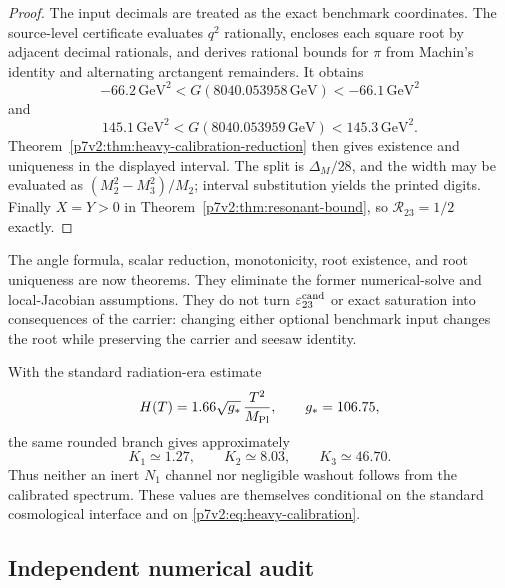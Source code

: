 \documentclass[11pt,a4paper]{article}
\begin{document}
\begin{proof}
The input decimals are treated as the exact benchmark coordinates.  The
source-level certificate evaluates \(q^2\) rationally, encloses each square
root by adjacent decimal rationals, and derives rational bounds for \(\pi\)
from Machin's identity and alternating arctangent remainders.  It obtains
\[
 -66.2\,\mathrm{GeV}^2<G(8040.053958\,\mathrm{GeV})
 <-66.1\,\mathrm{GeV}^2
\]
and
\[
 145.1\,\mathrm{GeV}^2<G(8040.053959\,\mathrm{GeV})
 <145.3\,\mathrm{GeV}^2.
\]
Theorem~\ref{p7v2:thm:heavy-calibration-reduction} then gives existence and
uniqueness in the displayed interval.  The split is \(\Delta_M/28\), and the
width may be evaluated as
\((M_2^2-M_3^2)/M_2\); interval substitution yields the printed digits.
Finally \(X=Y>0\) in Theorem~\ref{p7v2:thm:resonant-bound}, so
\(\mathcal R_{23}=1/2\) exactly.
\end{proof}

\begin{remark}
The angle formula, scalar reduction, monotonicity, root existence, and root
uniqueness are now theorems.  They eliminate the former numerical-solve and
local-Jacobian assumptions.  They do not turn
\(\varepsilon_{23}^{\rm cand}\) or exact saturation into consequences of the
carrier: changing either optional benchmark input changes the root while
preserving the carrier and seesaw identity.
\end{remark}

\begin{remark}
With the standard radiation-era estimate
\[
 H(T)=1.66\sqrt{g_*}\,\frac{T^2}{M_{\rm Pl}},
 \qquad g_*=106.75,
\]
the same rounded branch gives approximately
\[
 K_1\simeq1.27,\qquad K_2\simeq8.03,\qquad K_3\simeq46.70.
\]
Thus neither an inert \(N_1\) channel nor negligible washout follows from the
calibrated spectrum.  These values are themselves conditional on the standard
cosmological interface and on
\eqref{p7v2:eq:heavy-calibration}.
\end{remark}

\subsection{Independent numerical audit}
\label{p7v2:app:numerical-audit}
\end{document}
